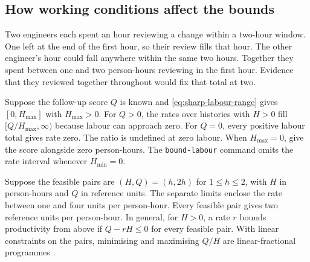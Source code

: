\subsection{How working conditions affect the bounds}

Two engineers each spent an hour reviewing a change within a two-hour window. One left at the end of the first hour, so their review fills that hour. The other engineer's hour could fall anywhere within the same two hours. Together they spent between one and two person-hours reviewing in the first hour. Evidence that they reviewed together throughout would fix that total at two.

Suppose the follow-up score $Q$ is known and \eqref{eq:sharp-labour-range} gives $[0,H_{\max}]$ with $H_{\max}>0$. For $Q>0$, the rates over histories with $H>0$ fill $[Q/H_{\max},\infty)$ because labour can approach zero. For $Q=0$, every positive labour total gives rate zero. The ratio is undefined at zero labour. When $H_{\max}=0$, give the score alongside zero person-hours. The \texttt{bound-labour} command omits the rate interval whenever $H_{\min}=0$.

Suppose the feasible pairs are $(H,Q)=(h,2h)$ for $1\leq h\leq2$, with $H$ in person-hours and $Q$ in reference units. The separate limits enclose the rate between one and four units per person-hour. Every feasible pair gives two reference units per person-hour. In general, for $H>0$, a rate $r$ bounds productivity from above if $Q-rH\leq0$ for every feasible pair. With linear constraints on the pairs, minimising and maximising $Q/H$ are linear-fractional programmes \cite[Section~4.3.2]{boydvandenberghe2004}.
